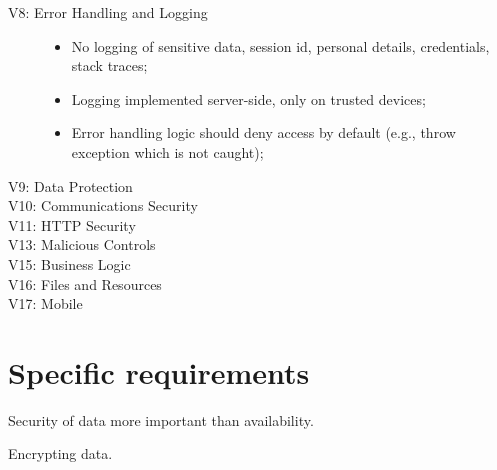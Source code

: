 \documentclass{report}
\begin{document}
\begin{description}
\item[V8: Error Handling and Logging] 
\begin{itemize}
\item No logging of sensitive data, session id, personal details, credentials, stack traces;
\item Logging implemented server-side, only on trusted devices;
\item Error handling logic should deny access by default (e.g., throw exception which is not caught);
\end{itemize}


\item[V9: Data Protection]
\begin{itemize}
\end{itemize}


\item[V10: Communications Security]
\begin{itemize}
\end{itemize}


\item[V11: HTTP Security]
\begin{itemize}
\end{itemize}


\item[V13: Malicious Controls]
\begin{itemize}
\end{itemize}

\item[V15: Business Logic]
\begin{itemize}
\end{itemize}


\item[V16: Files and Resources]
\begin{itemize}
\end{itemize}


\item[V17: Mobile]
\begin{itemize}
\end{itemize}


\end{description}


\section{Specific requirements}

Security of data more important than availability.

Encrypting data.
\end{document}
